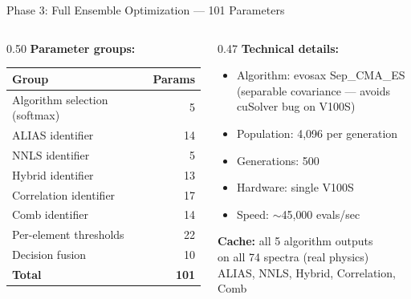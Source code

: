 \documentclass[aspectratio=169,12pt]{beamer}
\begin{document}
\begin{frame}{Phase 3: Full Ensemble Optimization --- 101 Parameters}
  \begin{columns}[T]
    \begin{column}{0.50\textwidth}
      \textbf{Parameter groups:}
      {\small
      \begin{table}
        \begin{tabular}{@{}lr@{}}
          \toprule
          Group & Params \\
          \midrule
          Algorithm selection (softmax) & 5 \\
          ALIAS identifier & 14 \\
          NNLS identifier & 5 \\
          Hybrid identifier & 13 \\
          Correlation identifier & 17 \\
          Comb identifier & 14 \\
          Per-element thresholds & 22 \\
          Decision fusion & 10 \\
          \midrule
          \textbf{Total} & \textbf{101} \\
          \bottomrule
        \end{tabular}
      \end{table}
      }
    \end{column}
    \begin{column}{0.47\textwidth}
      \textbf{Technical details:}
      \begin{itemize}
        \item Algorithm: evosax Sep\_CMA\_ES\\
              {\scriptsize (separable covariance --- avoids\\
               cuSolver bug on V100S)}
        \item Population: 4{,}096 per generation
        \item Generations: 500
        \item Hardware: single V100S
        \item Speed: $\sim$45{,}000 evals/sec
      \end{itemize}

      \vspace{0.3em}
      \textbf{Cache:} all 5 algorithm outputs\\
      on all 74 spectra (real physics)\\
      {\small ALIAS, NNLS, Hybrid, Correlation, Comb}


\end{column}
\end{columns}
\end{frame}
\end{document}

